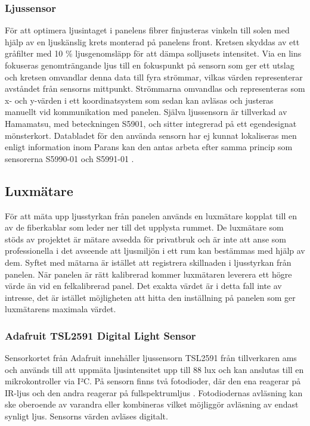         \subsubsection{Ljussensor} %
        \label{ssub:ljussensor}
            För att optimera ljusintaget i panelens fibrer finjusteras vinkeln till solen med hjälp av en ljuskänslig krets monterad på panelens front. Kretsen skyddas av ett gråfilter med 10 \% ljusgenomsläpp för att dämpa solljusets intensitet. Via en lins fokuseras genomträngande ljus till en fokuspunkt på sensorn som ger ett utslag och kretsen omvandlar denna data till fyra strömmar, vilkas värden representerar avståndet från sensorns mittpunkt. Strömmarna omvandlas och representeras som x- och y-värden i ett koordinatsystem som sedan kan avläsas och justeras manuellt vid kommunikation med panelen. Själva ljussensorn är tillverkad av Hamamatsu, med beteckningen S5901, och sitter integrerad på ett egendesignat mönsterkort. Databladet för den använda sensorn har ej kunnat lokaliseras men enligt information inom Parans kan den antas arbeta efter samma princip som sensorerna S5990-01 och S5991-01 \cite{hama}.

    \subsection{Luxmätare} %
    \label{sub:luxm_tare}
    För att mäta upp ljusstyrkan från panelen används en luxmätare kopplat till en av de fiberkablar som leder ner till det upplysta rummet. De luxmätare som stöds av projektet är mätare avsedda för privatbruk och är inte att anse som professionella i det avseende att ljusmiljön i ett rum kan bestämmas med hjälp av dem. Syftet med mätarna är istället att registrera skillnaden i ljusstyrkan från panelen. När panelen är rätt kalibrerad kommer luxmätaren leverera ett högre värde än vid en felkalibrerad panel. Det exakta värdet är i detta fall inte av intresse, det är istället möjligheten att hitta den inställning på panelen som ger luxmätarens maximala värdet.

        \subsubsection{Adafruit TSL2591 Digital Light Sensor}
            \label{ssub:ada_tsl2591}
            Sensorkortet från Adafruit innehåller ljussensorn TSL2591 från tillverkaren ams och används till att uppmäta ljusintensitet upp till 88 lux och kan anslutas till en mikrokontroller via I²C. På sensorn finns två fotodioder, där den ena reagerar på IR-ljus och den andra reagerar på fullspektrumljus \cite{TSL2591}. Fotodiodernas avläsning kan ske oberoende av varandra eller kombineras vilket möjliggör avläsning av endast synligt ljus. Sensorns värden avläses digitalt.


